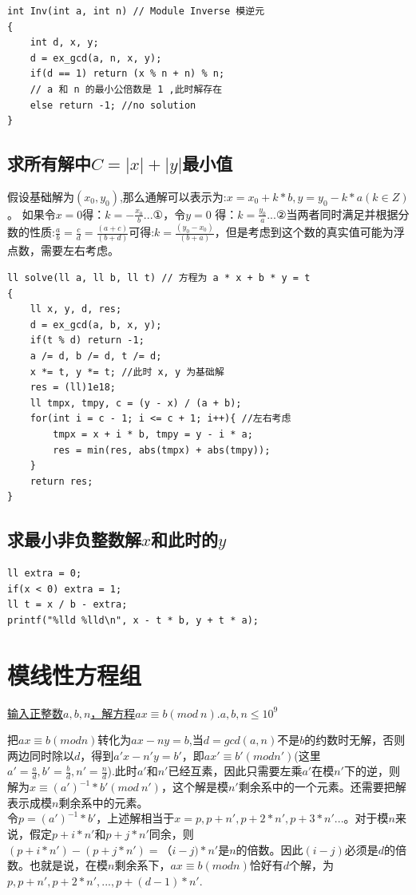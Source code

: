 \begin{lstlisting}
int Inv(int a, int n) // Module Inverse 模逆元
{
    int d, x, y;
    d = ex_gcd(a, n, x, y);
    if(d == 1) return (x % n + n) % n;
    // a 和 n 的最小公倍数是 1 ,此时解存在
    else return -1; //no solution
}
\end{lstlisting}

\subsection{求所有解中$C = |x| + |y|$最小值}

假设基础解为$(x_0, y_0)$,那么通解可以表示为:$x = x_0 + k * b, y = y_0 - k * a(k ∈ Z)$。 如果令$x = 0$得：$k = -\frac{x_0}{b}...①$，令$y = 0$ 得：$k = \frac{y_0}{a}...②$当两者同时满足并根据分数的性质:$\frac{a}{b} =\frac{c}{d} = \frac{(a + c)}{(b + d) }$可得:$ k = \frac{(y_0 - x_0)}{(b + a)}$，但是考虑到这个数的真实值可能为浮点数，需要左右考虑。

\begin{lstlisting}
ll solve(ll a, ll b, ll t) // 方程为 a * x + b * y = t
{
    ll x, y, d, res;
    d = ex_gcd(a, b, x, y);
    if(t % d) return -1;
    a /= d, b /= d, t /= d;
    x *= t, y *= t; //此时 x, y 为基础解
    res = (ll)1e18;
    ll tmpx, tmpy, c = (y - x) / (a + b);
    for(int i = c - 1; i <= c + 1; i++){ //左右考虑
        tmpx = x + i * b, tmpy = y - i * a;
        res = min(res, abs(tmpx) + abs(tmpy));
    }
    return res;
}
\end{lstlisting}

\subsection{求最小非负整数解$x$和此时的$y$}
\begin{lstlisting}
ll extra = 0;
if(x < 0) extra = 1;
ll t = x / b - extra;
printf("%lld %lld\n", x - t * b, y + t * a);
\end{lstlisting}

\section{模线性方程组}
\underline{输入正整数$a,b,n$，解方程$ax≡b(mod\ n).a,b,n\leq 10^9$}

把$ax\equiv b(mod n)$转化为$ax - ny = b$,当$d = gcd(a, n)$不是$b$的约数时无解，否则两边同时除以$d$，得到$a'x - n'y = b'$，即$ax' \equiv b'(mod n')$(这里$a' =\frac{a}{d},b' =\frac{b} {d} ,n'=\frac{n}{d}$).此时$a'$和$n'$已经互素，因此只需要左乘$a'$在模$n'$下的逆，则解为$x≡(a')^{-1}* b' (mod\  n')$，这个解是模$n'$剩余系中的一个元素。还需要把解表示成模$n$剩余系中的元素。 \\
令$p = (a')^{-1} * b'$，上述解相当于$x = p, p+n', p+2*n',p+3*n'...$。对于模$n$来说，假定$p+i*n'$和$p+j*n'$同余，则$(p+i*n') - (p+j*n') = （i-j)*n'是n$的倍数。因此$(i-j)$必须是$d$的倍数。也就是说，在模$n$剩余系下，$ax\equiv b(mod n)$恰好有$d$个解，为$p,p+n',p+2*n',...,p+(d-1)*n'$.

